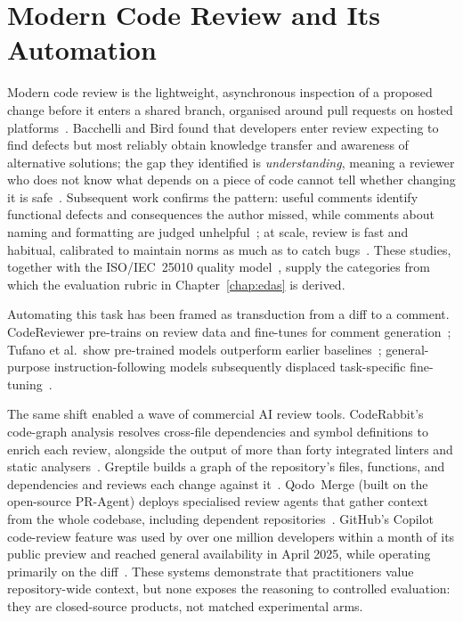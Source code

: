 \section{Modern Code Review and Its Automation}
\label{sec:bg-code-review}

Modern code review is the lightweight, asynchronous inspection of a proposed
change before it enters a shared branch, organised around pull requests on
hosted platforms~\cite{davila2021mcrslr}. Bacchelli and Bird found that
developers enter review expecting to find defects but most reliably obtain
knowledge transfer and awareness of alternative solutions; the gap they
identified is \emph{understanding}, meaning a reviewer who does not know what
depends on a piece of code cannot tell whether changing it is
safe~\cite{bacchelli2013}. Subsequent work confirms the pattern: useful comments
identify functional defects and consequences the author missed, while comments
about naming and formatting are judged unhelpful~\cite{bosu2015}; at scale,
review is fast and habitual, calibrated to maintain norms as much as to catch
bugs~\cite{sadowski2018}. These studies, together with the ISO/IEC~25010
quality model~\cite{iso25010}, supply the categories from which the evaluation
rubric in Chapter~\ref{chap:edas} is derived.

Automating this task has been framed as transduction from a diff to a comment.
CodeReviewer pre-trains on review data and fine-tunes for comment
generation~\cite{li2022codereviewer}; Tufano et al.\ show pre-trained models
outperform earlier baselines~\cite{tufano2022codereview}; general-purpose
instruction-following models subsequently displaced task-specific
fine-tuning~\cite{hou2023llmse,fan2023llmse}.

The same shift enabled a wave of commercial AI review tools. CodeRabbit's
code-graph analysis resolves cross-file dependencies and symbol definitions
to enrich each review, alongside the output of more than forty integrated
linters and static analysers~\cite{coderabbit2026}. Greptile builds a graph of the
repository's files, functions, and dependencies and reviews each change
against it~\cite{greptile2026}. Qodo~Merge (built on the open-source
PR-Agent) deploys specialised review agents that gather context from the
whole codebase, including dependent repositories~\cite{qodo2026}. GitHub's Copilot code-review feature was used by
over one million developers within a month of its public preview and reached
general availability in April 2025, while operating primarily on the
diff~\cite{copilotcr2025}. These systems demonstrate that
practitioners value repository-wide context, but none exposes the reasoning
to controlled evaluation: they are closed-source products, not matched
experimental arms.

